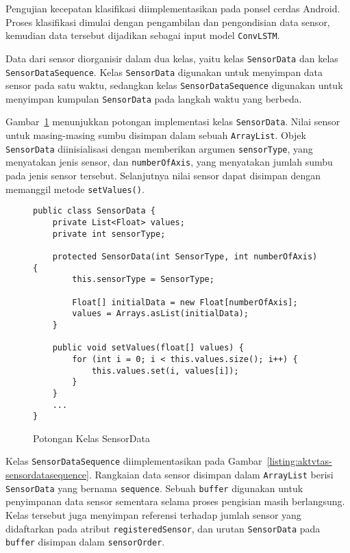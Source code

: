 Pengujian kecepatan klasifikasi diimplementasikan pada ponsel cerdas Android. Proses klasifikasi dimulai dengan pengambilan dan pengondisian data sensor, kemudian data tersebut dijadikan sebagai input model \texttt{ConvLSTM}.

Data dari sensor diorganisir dalam dua kelas, yaitu kelas \texttt{SensorData} dan kelas \texttt{SensorDataSequence}. Kelas \texttt{SensorData} digunakan untuk menyimpan data sensor pada satu waktu, sedangkan kelas \texttt{SensorDataSequence} digunakan untuk menyimpan kumpulan \texttt{SensorData} pada langkah waktu yang berbeda.

Gambar~\ref{listing:aktvtas-sensordata} menunjukkan potongan implementasi kelas \texttt{SensorData}. Nilai sensor untuk masing-masing sumbu disimpan dalam sebuah \texttt{ArrayList}. Objek \texttt{SensorData} diinisialisasi dengan memberikan argumen \texttt{sensorType}, yang menyatakan jenis sensor, dan \texttt{numberOfAxis}, yang menyatakan jumlah sumbu pada jenis sensor tersebut. Selanjutnya nilai sensor dapat disimpan dengan memanggil metode \texttt{setValues()}.

\begin{figure}[h]
\begin{verbatim}
public class SensorData {
    private List<Float> values;
    private int sensorType;

    protected SensorData(int SensorType, int numberOfAxis) {
        this.sensorType = SensorType;

        Float[] initialData = new Float[numberOfAxis];
        values = Arrays.asList(initialData);
    }

    public void setValues(float[] values) {
        for (int i = 0; i < this.values.size(); i++) {
            this.values.set(i, values[i]);
        }
    }
    ...
}
\end{verbatim}
\caption{Potongan Kelas SensorData}
\label{listing:aktvtas-sensordata}
\end{figure}

Kelas \texttt{SensorDataSequence} diimplementasikan pada Gambar~\ref{listing:aktvtas-sensordatasequence}. Rangkaian data sensor disimpan dalam \texttt{ArrayList} berisi \texttt{SensorData} yang bernama \texttt{sequence}. Sebuah \texttt{buffer} digunakan untuk penyimpanan data sensor sementara selama proses pengisian masih berlangsung. Kelas tersebut juga menyimpan referensi terhadap jumlah sensor yang didaftarkan pada atribut \texttt{registeredSensor}, dan urutan \texttt{SensorData} pada \texttt{buffer} disimpan dalam \texttt{sensorOrder}.


